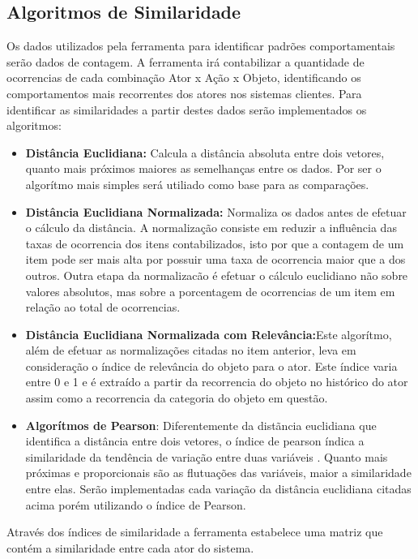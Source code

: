 \documentclass[
	12pt,				%
    oneside,			%
	a4paper,			%
	english,			%
	french,				%
	spanish,			%
	brazil,				%
	]{abntex2}
\begin{document}
\subsection{Algoritmos de Similaridade}
Os dados utilizados pela ferramenta para identificar padrões comportamentais serão dados de contagem. A ferramenta irá contabilizar a quantidade de ocorrencias de cada combinação Ator x Ação x Objeto, identificando
os comportamentos mais recorrentes dos atores nos sistemas clientes. Para identificar as similaridades a partir destes dados serão implementados os algoritmos:

\begin{itemize}
	\item \textbf{Distância Euclidiana:} Calcula a distância absoluta entre dois vetores, quanto mais próximos maiores as semelhanças entre os dados. Por ser o algorítmo mais simples será utiliado como base para as comparações.
	\item \textbf{Distância Euclidiana Normalizada:} Normaliza os dados antes de efetuar o cálculo da distância. A normalização consiste em reduzir a influência das taxas de ocorrencia dos itens contabilizados, isto por que a contagem de um item
	pode ser mais alta por possuir uma taxa de ocorrencia maior que a dos outros. Outra etapa da normalizacão é efetuar o cálculo euclidiano não sobre valores absolutos, mas sobre a porcentagem de ocorrencias de um item em relação ao total de ocorrencias.
	\item \textbf{Distância Euclidiana Normalizada com Relevância:}Este algorítmo, além de efetuar as normalizações citadas no item anterior, leva em consideração o índice de relevância do objeto para o ator. Este índice varia entre 0 e 1 e é extraído a 
	partir da recorrencia do objeto no histórico do ator assim como a recorrencia da categoria do objeto em questão.
	\item \textbf{Algorítmos de Pearson}: Diferentemente da distãncia euclidiana que identifica a distância entre dois vetores, o índice de pearson índica a similaridade da tendência de variação entre duas variáveis \cite{9-CorrelationBetweenVariables}. Quanto mais próximas e proporcionais são as flutuações 
	das variáveis, maior a similaridade entre elas. Serão implementadas cada variação da distância euclidiana citadas acima porém utilizando o índice de Pearson.
\end{itemize}

Através dos índices de similaridade a ferramenta estabelece uma matriz que contém a similaridade entre cada ator do sistema.
\end{document}
